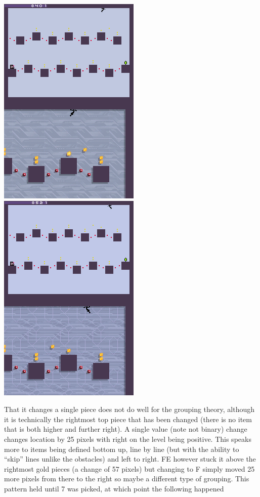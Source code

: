 \documentclass[
]{book}
\begin{document}
\includegraphics{images/183_home_fast6191_romhackingguide_unrenamed_fil___rs_romhackingguideleveleditingworkedNplus16.png}\includegraphics{images/184_home_fast6191_romhackingguide_unrenamed_fil___rs_romhackingguideleveleditingworkedNplus17.png}

That it changes a single piece does not do well for the grouping theory, although it is technically the rightmost top piece that has been changed (there is no item that is both higher and further right). A single value (note not binary) change changes location by 25 pixels with right on the level being positive. This speaks more to items being defined bottom up, line by line (but with the ability to ``skip'' lines unlike the obstacles) and left to right. FE however stuck it above the rightmost gold pieces (a change of 57 pixels) but changing to F simply moved 25 more pixels from there to the right so maybe a different type of grouping. This pattern held until 7 was picked, at which point the following happened
\end{document}
